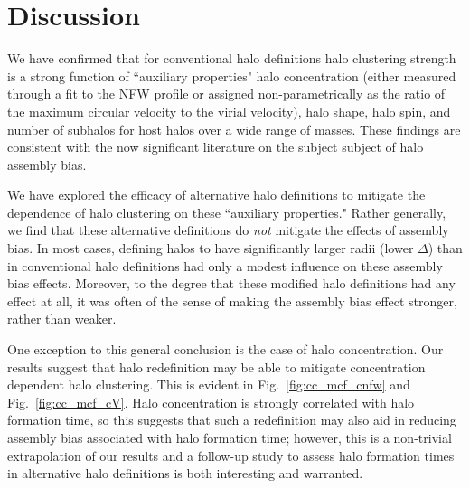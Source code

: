 \documentclass[usenatbib]{mnras}
\begin{document}
\section{Discussion}
\label{section:discussion}


We have confirmed that for conventional halo definitions 
halo clustering strength is a strong function of ``auxiliary properties" halo concentration (either measured
through a fit to the NFW profile or assigned non-parametrically as the ratio of the maximum circular velocity to
the virial velocity), halo shape, halo spin, and number of subhalos 
for host halos over a wide range of masses. These findings are consistent 
with the now significant literature on the subject subject of halo assembly bias. \citep{peacock_smith00, wechsler_etal02,
sheth_tormen04, gao_etal05, zentner_etal05, allgood_etal06, harker_etal06, wechsler_etal06, croton_etal07, dalal_etal08, mao_etal15, sunayama_etal16}

We have explored the efficacy of alternative halo definitions to mitigate the dependence of halo 
clustering on these ``auxiliary properties." Rather generally, we find that these alternative definitions 
do {\em not} mitigate the effects of assembly bias. In most cases, defining halos to have significantly 
larger radii (lower $\Delta$) than in conventional halo definitions had only a modest influence on 
these assembly bias effects. Moreover, to the degree that these modified halo definitions had 
any effect at all, it was often of the sense of 
making the assembly bias effect stronger, rather than weaker. 

One exception to this general conclusion is the case of halo concentration. 
Our results suggest that halo redefinition may be able to mitigate concentration 
dependent halo clustering. This is evident in Fig.~\ref{fig:cc_mcf_cnfw} and 
Fig.~\ref{fig:cc_mcf_cV}. Halo concentration is strongly correlated with halo formation 
time, so this suggests that such a redefinition may also aid in reducing assembly bias 
associated with halo formation time; however, this is a non-trivial extrapolation of our 
results and a follow-up study to assess halo formation times in alternative halo definitions 
is both interesting and warranted. 
\end{document}
